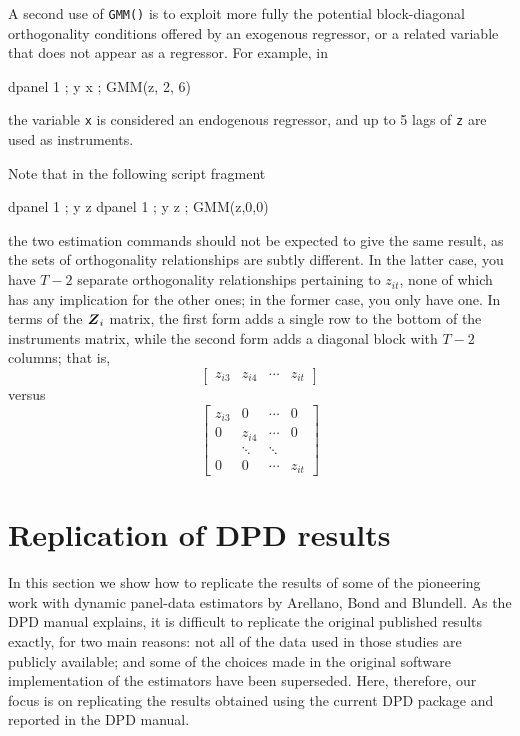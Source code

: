 A second use of \texttt{GMM()} is to exploit more fully the potential
block-diagonal orthogonality conditions offered by an exogenous
regressor, or a related variable that does not appear as a regressor.
For example, in

\begin{code}
  dpanel 1 ; y x ; GMM(z, 2, 6)
\end{code}
the variable \texttt{x} is considered an endogenous regressor, and up to
5 lags of \texttt{z} are used as instruments.

Note that in the following script fragment
\begin{code}
  dpanel 1 ; y z
  dpanel 1 ; y z ; GMM(z,0,0)
\end{code}
the two estimation commands should not be expected to give the same
result, as the sets of orthogonality relationships are subtly
different.  In the latter case, you have $T-2$ separate orthogonality
relationships pertaining to $z_{it}$, none of which has any
implication for the other ones; in the former case, you only have one.
In terms of the $\boldsymbol{Z}_i$ matrix, the first form adds a single row to
the bottom of the instruments matrix, while the second form adds a
diagonal block with $T-2$ columns; that is,
\[
  \left[ \begin{array}{cccc}
         z_{i3} & z_{i4} & \cdots & z_{it}
       \end{array} \right]
\] 
versus
\[
  \left[ \begin{array}{cccc}
         z_{i3} & 0 & \cdots & 0 \\
         0 & z_{i4} & \cdots & 0 \\
          & \ddots & \ddots &  \\
         0 & 0 & \cdots & z_{it} 
       \end{array} \right]
\]

\section{Replication of DPD results}
\label{sec:DPD-replic}

In this section we show how to replicate the results of some of the
pioneering work with dynamic panel-data estimators by Arellano, Bond
and Blundell.  As the DPD manual \citep*{DPDmanual} explains, it is
difficult to replicate the original published results exactly, for two
main reasons: not all of the data used in those studies are publicly
available; and some of the choices made in the original software
implementation of the estimators have been superseded.  Here,
therefore, our focus is on replicating the results obtained using the
current DPD package and reported in the DPD manual.

